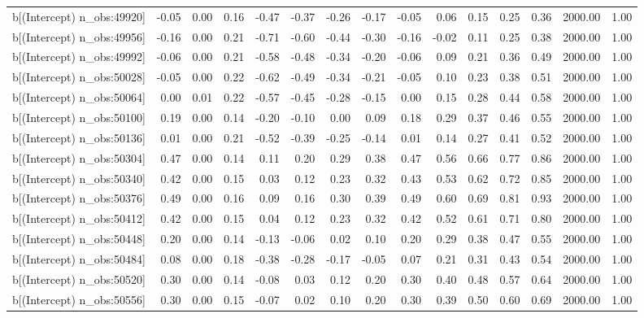 \begin{table}[ht]
\begin{tabular}{rrrrrrrrrrrrrrr}
  b[(Intercept) n\_obs:49920] & -0.05 & 0.00 & 0.16 & -0.47 & -0.37 & -0.26 & -0.17 & -0.05 & 0.06 & 0.15 & 0.25 & 0.36 & 2000.00 & 1.00 \\ 
  b[(Intercept) n\_obs:49956] & -0.16 & 0.00 & 0.21 & -0.71 & -0.60 & -0.44 & -0.30 & -0.16 & -0.02 & 0.11 & 0.25 & 0.38 & 2000.00 & 1.00 \\ 
  b[(Intercept) n\_obs:49992] & -0.06 & 0.00 & 0.21 & -0.58 & -0.48 & -0.34 & -0.20 & -0.06 & 0.09 & 0.21 & 0.36 & 0.49 & 2000.00 & 1.00 \\ 
  b[(Intercept) n\_obs:50028] & -0.05 & 0.00 & 0.22 & -0.62 & -0.49 & -0.34 & -0.21 & -0.05 & 0.10 & 0.23 & 0.38 & 0.51 & 2000.00 & 1.00 \\ 
  b[(Intercept) n\_obs:50064] & 0.00 & 0.01 & 0.22 & -0.57 & -0.45 & -0.28 & -0.15 & 0.00 & 0.15 & 0.28 & 0.44 & 0.58 & 2000.00 & 1.00 \\ 
  b[(Intercept) n\_obs:50100] & 0.19 & 0.00 & 0.14 & -0.20 & -0.10 & 0.00 & 0.09 & 0.18 & 0.29 & 0.37 & 0.46 & 0.55 & 2000.00 & 1.00 \\ 
  b[(Intercept) n\_obs:50136] & 0.01 & 0.00 & 0.21 & -0.52 & -0.39 & -0.25 & -0.14 & 0.01 & 0.14 & 0.27 & 0.41 & 0.52 & 2000.00 & 1.00 \\ 
  b[(Intercept) n\_obs:50304] & 0.47 & 0.00 & 0.14 & 0.11 & 0.20 & 0.29 & 0.38 & 0.47 & 0.56 & 0.66 & 0.77 & 0.86 & 2000.00 & 1.00 \\ 
  b[(Intercept) n\_obs:50340] & 0.42 & 0.00 & 0.15 & 0.03 & 0.12 & 0.23 & 0.32 & 0.43 & 0.53 & 0.62 & 0.72 & 0.85 & 2000.00 & 1.00 \\ 
  b[(Intercept) n\_obs:50376] & 0.49 & 0.00 & 0.16 & 0.09 & 0.16 & 0.30 & 0.39 & 0.49 & 0.60 & 0.69 & 0.81 & 0.93 & 2000.00 & 1.00 \\ 
  b[(Intercept) n\_obs:50412] & 0.42 & 0.00 & 0.15 & 0.04 & 0.12 & 0.23 & 0.32 & 0.42 & 0.52 & 0.61 & 0.71 & 0.80 & 2000.00 & 1.00 \\ 
  b[(Intercept) n\_obs:50448] & 0.20 & 0.00 & 0.14 & -0.13 & -0.06 & 0.02 & 0.10 & 0.20 & 0.29 & 0.38 & 0.47 & 0.55 & 2000.00 & 1.00 \\ 
  b[(Intercept) n\_obs:50484] & 0.08 & 0.00 & 0.18 & -0.38 & -0.28 & -0.17 & -0.05 & 0.07 & 0.21 & 0.31 & 0.43 & 0.54 & 2000.00 & 1.00 \\ 
  b[(Intercept) n\_obs:50520] & 0.30 & 0.00 & 0.14 & -0.08 & 0.03 & 0.12 & 0.20 & 0.30 & 0.40 & 0.48 & 0.57 & 0.64 & 2000.00 & 1.00 \\ 
  b[(Intercept) n\_obs:50556] & 0.30 & 0.00 & 0.15 & -0.07 & 0.02 & 0.10 & 0.20 & 0.30 & 0.39 & 0.50 & 0.60 & 0.69 & 2000.00 & 1.00 \\ 

\end{tabular}
\end{table}
